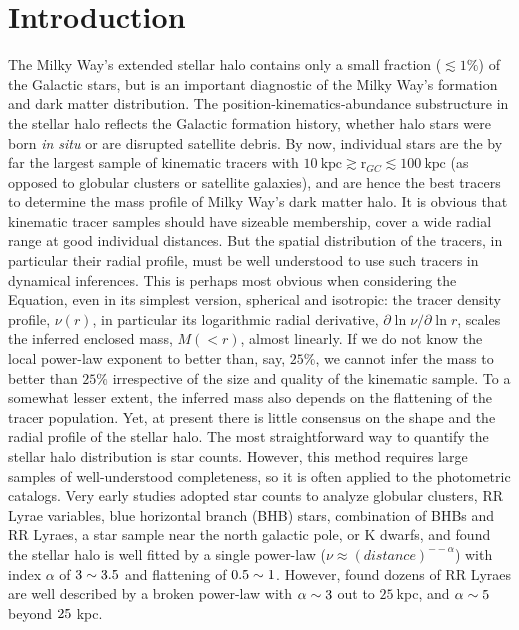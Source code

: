 \documentclass[12pt,preprint]{aastex}
\newcommand{\rgc}{\ensuremath{\mathrm{r}_{GC}}}
\begin{document}
\section{Introduction}\label{sec:Introduction}
The Milky Way's extended stellar halo contains only a small fraction ($\lesssim 1\%$) of the Galactic stars, but is an important diagnostic of the Milky Way's formation and dark matter distribution. The position-kinematics-abundance substructure in the stellar halo reflects the Galactic formation history, whether halo stars were born \textit{in situ} or are disrupted satellite debris. By now, individual stars are the by far the largest sample of
kinematic tracers with
$10~\mathrm{kpc}\gtrsim \rgc\lesssim 100~\mathrm{kpc}$ (as opposed to globular clusters or satellite galaxies), and are hence the best tracers to determine the mass profile of Milky Way's dark matter halo. It is obvious that kinematic tracer samples should have sizeable membership, cover a wide radial range at good individual distances. But the spatial distribution of the tracers, in particular their radial profile, must be well understood to use such tracers in dynamical inferences. This is perhaps most obvious when considering the \citet{Jeans1915} Equation, even in its simplest version, spherical and isotropic: the tracer
density profile, $\nu (r)$, in particular its logarithmic radial derivative,
$\partial{\ln \nu}/\partial{\ln r}$, scales the inferred enclosed mass, $M(<r)$, almost linearly.
If we do not know the local power-law exponent to better than, say, $25\%$, we cannot
infer the mass to better than $25\%$ irrespective of the size and quality of the kinematic sample. To a somewhat lesser extent, the inferred mass also depends on the flattening of the tracer population. Yet, at present there is little consensus on the shape and the radial profile of the stellar halo.
The most straightforward way to quantify the stellar halo distribution is star counts. However, this method requires large samples of well-understood completeness, so it is often applied to the photometric catalogs. Very early studies adopted star counts to analyze globular clusters\citep{Harris1976}, RR Lyrae variables\citep{Hawkins1984,Wetterer1996}, blue horizontal branch (BHB) stars\citep{Sommer-Larsen1987}, combination of BHBs and RR Lyraes\citep{Sluis1998}, a star sample near the north galactic pole\citep{Soubiran1993}, or K dwarfs\citep{Gould1998}, and found the stellar halo is well fitted by a single power-law ($\nu \approx (distance)^{−-\alpha}$) with index $\alpha$ of $\rm 3\sim3.5$ and flattening of $\rm 0.5\sim1$. However, \citet{Saha1985} found dozens of RR Lyraes are well described by a broken power-law with $\rm \alpha \sim 3$ out to $25~$kpc, and $\rm \alpha \sim 5$ beyond $\rm 25~$kpc.
\end{document}
